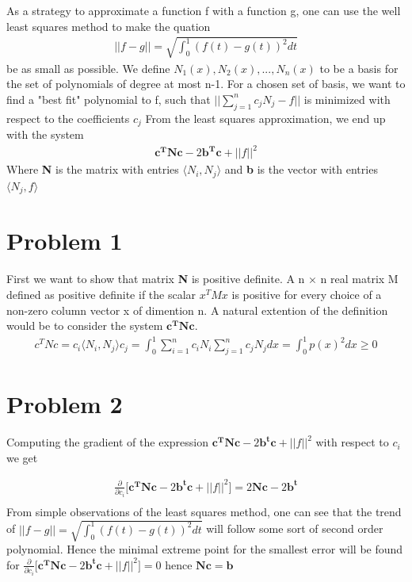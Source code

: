 \documentclass[a4paper,norsk]{article}
\begin{document}
\maketitle


As a strategy to approximate a function f with a function g, one can use the well least squares method to make the quation
\begin{align}
||f - g|| = \sqrt{\int_0^1 (f(t) - g(t) )^2 dt }	
\end{align} 
be as small as possible.
We define ${N_1(x), N_2(x), ..., N_n(x)}$ to be a basis for the set of polynomials of degree at most n-1. For a chosen set of basis, we want to 
find a "best fit" polynomial to f, such that $||\sum_{j=1}^n c_j N_j - f ||$ is minimized with respect to the coefficients $c_j$
From the least squares approximation, we end up with the system
\begin{align}
\mathbf{c^T N c} -2\mathbf{b^T c} + ||f||^2
\end{align}
Where \textbf{N} is the matrix with entries $\langle N_i, N_j \rangle$ and \textbf{b} is the vector with entries $\langle N_j, f \rangle$ 

\section*{Problem 1}
First we want to show that matrix \textbf{N} is positive definite.  A n × n real matrix M defined as positive definite if the scalar $ x^{T}M x$ is positive for every choice of a non-zero column vector x of dimention n. A natural extention of the definition would be to consider the system $\mathbf{c^TNc}$.
\begin{align}
c^TNc = c_i \langle N_i, N_j \rangle c_j = \int_0^1 \sum_{i=1}^n c_i N_i \sum_{j=1}^n c_j N_j dx = \int_0^1 p(x)^2 dx  \geq 0
\end{align}

\section*{Problem 2}
Computing the gradient of the expression $\mathbf{c^T N c} -2 \mathbf{b^t c} + ||f||^2 $ with respect to $c_i$ we get

\begin{align}
\frac{\partial}{\partial c_i} \Big[ \mathbf{c^T N c} -2 \mathbf{b^t c} + ||f||^2\Big] = 2\mathbf{Nc} - 2\mathbf{b^t} \\
\end{align}
From simple observations of the least squares method, one can see that the trend of $||f - g|| = \sqrt{\int_0^1 (f(t) - g(t) )^2 dt }$ will follow some sort of second order polynomial. Hence the minimal
extreme point for the smallest error will be found for 
$\frac{\partial}{\partial c_i} \Big[ \mathbf{c^T N c} -2 \mathbf{b^t c} + ||f||^2\Big] = 0 $ hence $\mathbf{Nc} = \mathbf{b}$ 
\end{document}
